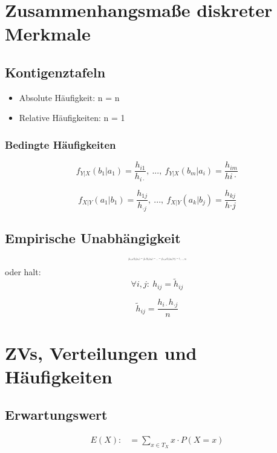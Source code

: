 \documentclass[10pt,a4paper,landscape]{article}
\begin{document}
\begin{multicols}{4}
\section{Zusammenhangsmaße diskreter Merkmale}

\subsection{Kontigenztafeln}
\begin{itemize}
\item Absolute Häufigkeit: n = n
\item Relative Häufigkeiten: n = 1
\end{itemize}

\subsubsection*{Bedingte Häufigkeiten}

\[
f_{Y|X}(b_1|a_1)=\frac{h_{i1}}{h_{i\cdot}},~...,~ f_{Y|X}(b_m|a_i)=\frac{h_{im}}{h{i\cdot}}
\]

\[
f_{X|Y}(a_1|b_1)=\frac{h_{1j}}{h_{\cdot j}},~...,~ f_{X|Y}(a_k|b_j)=\frac{h_{kj}}{h{\cdot j}}
\]

\subsection{Empirische Unabhängigkeit}
\[ \resizebox{0.2\textwidth}{!}{$
f_{Y|X}(b_j|a_1)=f_Y(b_j|a_2)=...=f_{Y|X}(b_j|a_k)\forall j=1,...,m
$}
\]
oder halt:
\[
\forall i,j: ~ h_{ij}=\tilde{h}_{ij}
\]

\[
\tilde{h}_{ij}=\frac{h_{i \cdot} h_{\cdot j}}{n}
\]


\section{ZVs, Verteilungen und Häufigkeiten}

\subsection{Erwartungswert}
\begin{align*}
E(X) :&=\sum_{x\in T_X} x\cdot P(X=x)
\end{align*}


\end{multicols}
\end{document}

